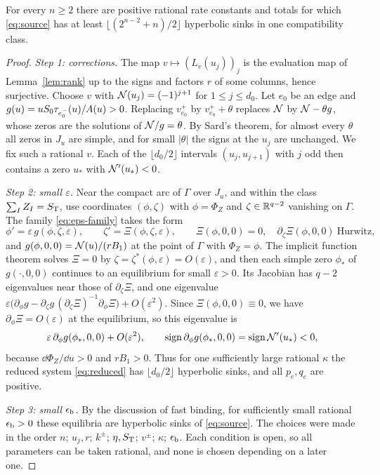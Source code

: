 \begin{theorem}\label{thm:lower}
For every \(n\ge2\) there are positive rational rate constants and totals for which
\eqref{eq:source} has at least \(\lfloor(2^{n-2}+n)/2\rfloor\) hyperbolic sinks in one
compatibility class.
\end{theorem}
\begin{proof}
\emph{Step 1: corrections.} The map \(v\mapsto(L_v(u_j))_j\) is the evaluation map of
Lemma~\ref{lem:rank} up to the signs and factors \(r\) of some columns, hence surjective.
Choose \(v\) with \(\mathcal N(u_j)=(-1)^{j+1}\) for \(1\le j\le d_0\). Let \(e_0\) be an edge and
\(g(u)=uS_0\tau_{e^{-}_0}(u)/A(u)>0\). Replacing \(v_{e_0}^+\) by \(v_{e_0}^++\theta\)
replaces \(\mathcal N\) by \(\mathcal N-\theta g\), whose zeros are the solutions of \(\mathcal N/g=\theta\). By
Sard's theorem, for almost every \(\theta\) all zeros in \(J_u\) are simple, and for small
\(|\theta|\) the signs at the \(u_j\) are unchanged. We fix such a rational \(v\). Each of the
\(\lfloor d_0/2\rfloor\) intervals \((u_j,u_{j+1})\) with \(j\) odd then contains a zero
\(u_*\) with \(\mathcal N'(u_*)<0\).

\emph{Step 2: small \(\varepsilon\).} Near the compact arc of \(\Gamma\) over \(J_u\), and
within the class \(\sum_IZ_I=S_{\mathrm T}\), use coordinates \((\phi,\zeta)\) with \(\phi=\Phi_Z\) and
\(\zeta\in\mathbb R^{q-2}\) vanishing on \(\Gamma\). The family \eqref{eq:eps-family} takes the form
\[
 \phi'=\varepsilon\,g(\phi,\zeta,\varepsilon),\qquad
 \zeta'=\Xi(\phi,\zeta,\varepsilon),\qquad \Xi(\phi,0,0)=0,\quad
 \partial_\zeta\Xi(\phi,0,0)\ \text{Hurwitz},
\]
and \(g(\phi,0,0)=\mathcal N(u)/(rB_1)\) at the point of \(\Gamma\) with \(\Phi_Z=\phi\). The
implicit function theorem solves \(\Xi=0\) by \(\zeta=\zeta^*(\phi,\varepsilon)=O(\varepsilon)\),
and then each simple zero \(\phi_*\) of \(g(\cdot,0,0)\) continues to an equilibrium for small
\(\varepsilon>0\). Its Jacobian has \(q-2\) eigenvalues near those of \(\partial_\zeta\Xi\), and
one eigenvalue
\(\varepsilon\bigl(\partial_\phi g-\partial_\zeta g\,(\partial_\zeta\Xi)^{-1}\partial_\phi\Xi\bigr)
+O(\varepsilon^2)\). Since \(\Xi(\phi,0,0)\equiv0\), we have
\(\partial_\phi\Xi=O(\varepsilon)\) at the equilibrium, so this eigenvalue is
\begin{equation}\label{eq:slow-eig}
 \varepsilon\,\partial_\phi g(\phi_*,0,0)+O(\varepsilon^2),\qquad
 \operatorname{sign}\partial_\phi g(\phi_*,0,0)=\operatorname{sign}\mathcal N'(u_*)<0,
\end{equation}
because \(\dd\Phi_Z/\dd u>0\) and \(rB_1>0\). Thus for one sufficiently large rational
\(\kappa\) the reduced system \eqref{eq:reduced} has \(\lfloor d_0/2\rfloor\) hyperbolic sinks,
and all \(p_e,q_e\) are positive.

\emph{Step 3: small \(\epsilon_{\mathrm b}\).} By the discussion of fast binding, for sufficiently small
rational \(\epsilon_{\mathrm b}>0\) these equilibria are hyperbolic sinks of \eqref{eq:source}. The choices were
made in the order \(n\); \(u_j,r\); \(k^\pm\); \(\eta,S_{\mathrm T}\); \(v^\pm\); \(\kappa\); \(\epsilon_{\mathrm b}\). Each
condition is open, so all parameters can be taken rational, and none is chosen depending on a
later one.
\end{proof}

